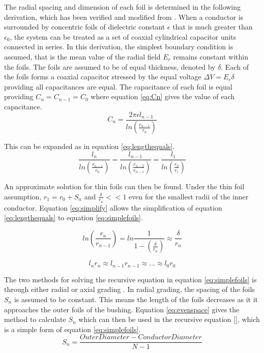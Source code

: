 The radial spacing and dimension of each foil is determined in the following derivation, which has been verified and modified from \cite{kuffel2000high}.
When a conductor is surrounded by concentric foils of dielectric constant $\epsilon$ that is much greater than $\epsilon_{0}$, the system can be treated as a set of coaxial cylindrical capacitor units connected in series.
In this derivation, the simplest boundary condition is assumed, that is the mean value of the radial field $E_r$ remains constant within the foils.
The foils are assumed to be of equal thickness, denoted by $\delta$.
Each of the foils forms a coaxial capacitor stressed by the equal voltage $\Delta V = E_{r}\delta$ providing all capacitances are equal.
The capacitance of each foil is equal providing $C_n = C_{n-1} = C_0$ where equation \ref{eq:Cn} gives the value of each capacitance.
\begin{equation}
   \label{eq:Cn}
   C_n = \frac{2\pi\epsilon l_{n-1}}{ln(\frac{r_{n-1}}{r_{n}})}
\end{equation}

This can be expanded as in equation \ref{eq:lengthequals}.
\begin{equation}
   \label{eq:lengthequals}
   \frac{l_n}{ln(\frac{r_{n-1}}{r_{n}})} = \frac{l_{n-1}}{ln(\frac{r_{n-2}}{r_{n-1}})} = \frac{l_1}{ln(\frac{r_{0}}{r_{1}})}
\end{equation}

An approximate solution for thin foils can then be found.
Under the thin foil assumption, $r_{1} = r_{0} + S_n$ and $\frac{\delta}{r_n}<<1$ even for the smallest radii of the inner conductor.
Equation \ref{eq:simplify} allows the simplification of equation \ref{eq:lengthequals} to equation \ref{eq:simplefoils}.

\begin{equation}
   \label{eq:simplify}
   ln(\frac{r_n}{r_{n-1}}) = ln\frac{1}{1-(\frac{\delta}{r_n})} \approx \frac{\delta}{r_n}
\end{equation}

\begin{equation}
   \label{eq:simplefoils}
   l_{n}r_{n} \approx l_{n-1}r_{n-1} \approx \dots \approx l_{0}r_{0}
\end{equation}

The two methods for solving the recursive equation in equation \ref{eq:simplefoils} is through either radial or axial grading \cite{Ahmed11}.
In radial grading, the spacing of the foils $S_n$ is assumed to be constant. 
This means the length of the foils decreases as it it approaches the outer foils of the bushing.
Equation \ref{eq:evenspace} gives the method to calculate $S_n$ which can then be used in the recursive equation \ref{}, which is a simple form of equation \ref{eq:simplefoils}.
\begin{equation}
   \label{eq:evenspace}
  S_n = \frac{Outer Diameter - Conductor Diameter}{N-1}
\end{equation}

